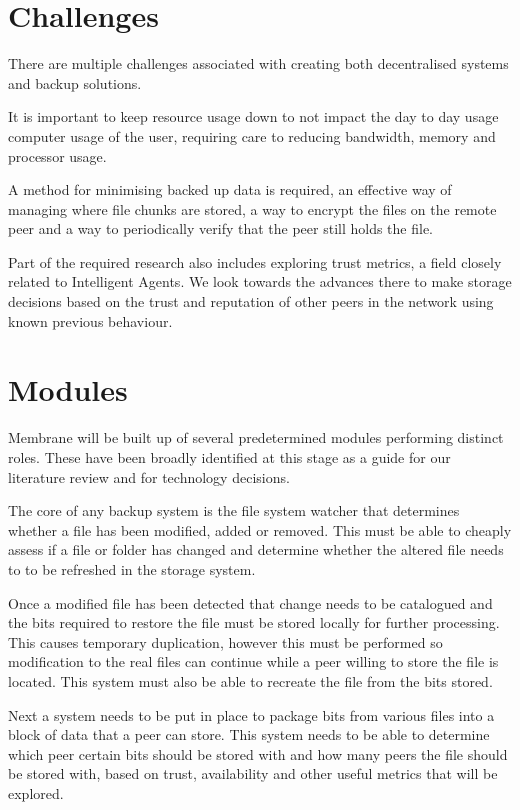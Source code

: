 \documentclass[11pt, a4paper, twoside]{report}
\begin{document}
\section{Challenges}
There are multiple challenges associated with creating both decentralised systems and backup solutions.

It is important to keep resource usage down to not impact the day to day usage computer usage of the user, requiring care to reducing bandwidth, memory and processor usage.

A method for minimising backed up data is required, an effective way of managing where file chunks are stored, a way to encrypt the files on the remote peer and a way to periodically verify that the peer still holds the file.

Part of the required research also includes exploring trust metrics, a field closely related to Intelligent Agents. We look towards the advances there to make storage decisions based on the trust and reputation of other peers in the network using known previous behaviour.

\section{Modules}

Membrane will be built up of several predetermined modules performing distinct roles. These have been broadly identified at this stage as a guide for our literature review and for technology decisions.

The core of any backup system is the file system watcher that determines whether a file has been modified, added or removed. This must be able to cheaply assess if a file or folder has changed and determine whether the altered file needs to to be refreshed in the storage system.

Once a modified file has been detected that change needs to be catalogued and the bits required to restore the file must be stored locally for further processing. This causes temporary duplication, however this must be performed so modification to the real files can continue while a peer willing to store the file is located. This system must also be able to recreate the file from the bits stored.

Next a system needs to be put in place to package bits from various files into a block of data that a peer can store. This system needs to be able to determine which peer certain bits should be stored with and how many peers the file should be stored with, based on trust, availability and other useful metrics that will be explored.
\end{document}
